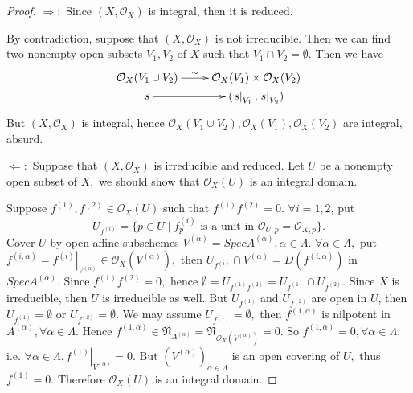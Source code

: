 \begin{proof}
$\Longrightarrow:$ Since $(X, \mathcal {O}_X)$ is integral, then it
is reduced.

By contradiction, suppose that $(X, \mathcal {O}_X)$ is not
irreducible. Then we can find two nonempty open subsets $V_1, V_2$
of $X$ such that $V_1\cap V_2=\emptyset.$ Then we have
\[ \xymatrix@R=0em{
   {\mathcal {O}_X(V_1\cup V_2)} \ar[r]^-{\sim} & {\mathcal {O}_X(V_1)\times \mathcal
   {O}_X(V_2)}                                      \\
   s \ar@{|->}[r] & {(\left.s\right|_{V_1}, \left.s\right|_{V_2})} }  \]
But $(X, \mathcal {O}_X)$ is integral, hence $\mathcal {O}_X(V_1\cup
V_2), \mathcal {O}_X(V_1), \mathcal {O}_X(V_2)$ are integral,
absurd.

$\Longleftarrow:$ Suppose that $(X, \mathcal {O}_X)$ is irreducible
and reduced. Let $U$ be a nonempty open subset of $X,$ we should
show that $\mathcal {O}_X(U)$ is an integral domain.

Suppose $f^{(1)}, f^{(2)}\in \mathcal {O}_X(U)$ such that
$f^{(1)}f^{(2)}=0.$ $\forall i=1,2$, put
$$U_{f^{(i)}}=\{p\in U\mid f^{(i)}_p\text{ is a unit in }\mathcal
{O}_{U,p}=\mathcal {O}_{X,p}\}.$$ Cover $U$ by open affine
subschemes $V^{(\alpha)}=SpecA^{(\alpha)}, \alpha\in\Lambda.$
$\forall\alpha\in\Lambda,$ put
$f^{(i,\alpha)}=\left.f^{(i)}\right|_{V^{(\alpha)}}\in\mathcal
{O}_X(V^{(\alpha)}),$ then $U_{f^{(i)}}\cap
V^{(\alpha)}=D(f^{(i,\alpha)})$ in $SpecA^{(\alpha)}.$ Since
$f^{(1)}f^{(2)}=0,$ hence
$\emptyset=U_{f^{(1)}f^{(2)}}=U_{f^{(1)}}\cap U_{f^{(2)}}.$ Since
$X$ is irreducible, then $U$ is irreducible as well. But
$U_{f^{(1)}}$ and $U_{f^{(2)}}$ are open in $U$, then
$U_{f^{(1)}}=\emptyset$ or $U_{f^{(2)}}=\emptyset.$ We may assume
$U_{f^{(1)}}=\emptyset,$ then $f^{(1,\alpha)}$ is nilpotent in
$A^{(\alpha)}, \forall\alpha\in\Lambda.$ Hence
$f^{(1,\alpha)}\in\mathfrak{N}_{A^{(\alpha)}}=\mathfrak{N}_{\mathcal
{O}_X(V^{(\alpha)})}=0.$ So $f^{(1,\alpha)}=0,
\forall\alpha\in\Lambda.$ i.e. $\forall\alpha\in\Lambda,
\left.f^{(1)}\right|_{V^{(\alpha)}}=0.$ But
$(V^{(\alpha)})_{\alpha\in\Lambda}$ is an open covering of $U,$ thus
$f^{(1)}=0.$ Therefore $\mathcal {O}_X(U)$ is an integral domain.
\end{proof}
